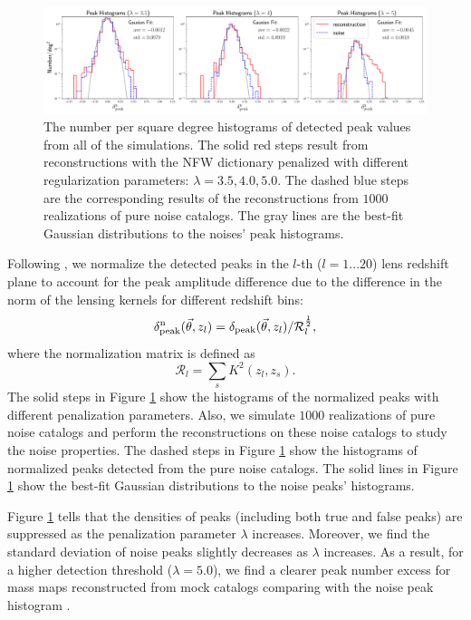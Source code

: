 \begin{figure}
 \centering
 \includegraphics[width=1.0\textwidth]{peak_histograms_NFW.pdf}
 \caption{The number per square degree histograms of detected peak values from
     all of the simulations.  The solid red steps result from reconstructions
     with the NFW dictionary penalized with different regularization
     parameters: $\lambda=3.5,4.0,5.0$. The dashed blue steps are the
     corresponding results of the reconstructions from $1000$ realizations of
     pure noise catalogs. The gray lines are the best-fit Gaussian distributions
     to the noises' peak histograms.
    }\label{fig_peakHist}
\end{figure}

Following \citet{WL-massMap-Glimpse2D-Lanusse2016}, we normalize the detected
peaks in the $l$-th ($l=1...20$) lens redshift plane to account for the peak
amplitude difference due to the difference in the norm of the lensing kernels
for different redshift bins:
\begin{equation}
\delta^{\rm{n}}_{\rm{peak}}(\vec{\theta},z_l)=\delta_{\rm{peak}}(\vec{\theta},z_l)/\mathcal{R}_{l}^{\frac{1}{2}},
\end{equation}
where the normalization matrix is defined as
\begin{equation}
\mathcal{R}_{l}=\sum_s K^2(z_l,z_s).
\end{equation}
The solid steps in Figure \ref{fig_peakHist} show the histograms of the
normalized peaks with different penalization parameters. Also, we simulate
$1000$ realizations of pure noise catalogs and perform the reconstructions on
these noise catalogs to study the noise properties. The dashed steps in Figure
\ref{fig_peakHist} show the histograms of normalized peaks detected from the
pure noise catalogs. The solid lines in Figure \ref{fig_peakHist} show the
best-fit Gaussian distributions to the noise peaks' histograms.

Figure \ref{fig_peakHist} tells that the densities of peaks (including both
true and false peaks) are suppressed as the penalization parameter $\lambda$
increases. Moreover, we find the standard deviation of noise peaks slightly
decreases as $\lambda$ increases. As a result, for a higher detection threshold
($\lambda=5.0$), we find a clearer peak number excess for mass maps
reconstructed from mock catalogs comparing with the noise peak histogram .

